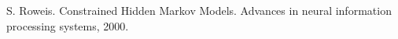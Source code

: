 \documentclass[english]{article}
\numberwithin{equation}{section}
\begin{document}
	
	\begin{thebibliography}{1}
		S. Roweis. Constrained Hidden Markov Models. Advances in neural information processing systems, 2000.
	\end{thebibliography}
	
\end{document}
